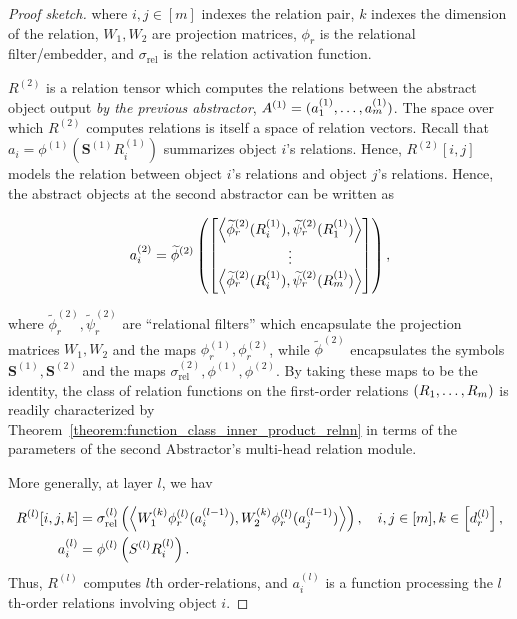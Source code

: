 \begin{proof}[Proof sketch]
	where $i,j \in [m]$ indexes the relation pair, $k$ indexes the dimension of the relation, $W_1, W_2$ are projection matrices, $\phi_r$ is the relational filter/embedder, and $\sigma_{\mathrm{rel}}$ is the relation activation function.

	$R^{(2)}$ is a relation tensor which computes the relations between the abstract object output \textit{by the previous abstractor}, $A^{(1)} = (a_1^{(1)}, \ldots, a_m^{(1)})$. The space over which $R^{(2)}$ computes relations is itself a space of relation vectors. Recall that $a_i = \phi^{(1)}(\bm{S}^{(1)} R_i^{(1)})$ summarizes object $i$'s relations. Hence, $R^{(2)}[i,j]$ models the relation between object \(i\)'s relations and object \(j\)'s relations. Hence, the abstract objects at the second abstractor can be written as

	\begin{equation*}
		a_i^{(2)} = \widetilde{\phi}^{(2)}\left( \begin{bmatrix}
			\left\langle \widetilde{\phi}_r^{(2)}(R_i^{(1)}), \widetilde{\psi}_r^{(2)}(R_1^{(1)})\right\rangle \\
			\vdots \\
			\left\langle \widetilde{\phi}_r^{(2)}(R_i^{(1)}), \widetilde{\psi}_r^{(2)}(R_m^{(1)})\right\rangle
		\end{bmatrix}\right),
	\end{equation*}

	where $\tilde{\phi}_r^{(2)}, \tilde{\psi}_r^{(2)}$ are ``relational filters'' which encapsulate the projection matrices $W_1, W_2$ and the maps $\phi_r^{(1)}, \phi_r^{(2)}$, while $\tilde{\phi}^{(2)}$ encapsulates the symbols $\bm{S}^{(1)}, \bm{S}^{(2)}$ and the maps $\sigma_{\mathrm{rel}}^{(2)}, \phi^{(1)}, \phi^{(2)}$. By taking these maps to be the identity, the class of relation functions on the first-order relations $(R_1, \ldots, R_m)$ is readily characterized by Theorem~\ref{theorem:function_class_inner_product_relnn} in terms of the parameters of the second Abstractor's multi-head relation module.

	More generally, at layer \(l\), we hav

	\begin{align*}
		R^{(l)}[i, j, k] &= \sigma_{\mathrm{rel}}^{(l)}\left(\left\langle W_1^{(k)} \phi_r^{(l)}(a_i^{(l-1)}), W_2^{(k)} \phi_r^{(l)}(a_j^{(l-1)}) \right\rangle\right), \quad i,j \in [m], k \in \left[d_r^{(l)}\right], \\
		a_i^{(l)} &= \phi^{(l)}\left(S^{(l)} R_i^{(l)}\right).
	\end{align*}
	Thus, \(R^{(l)}\) computes \(l\)th order-relations, and \(a_i^{(l)}\) is a function processing the \(l\)th-order relations involving object \(i\).
\end{proof}


